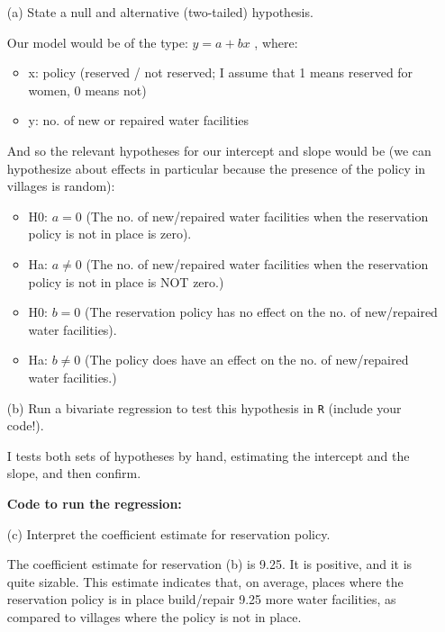 \documentclass[12pt,letterpaper]{article}
\begin{document}
\newpage
\begin{enumerate}
	\item [(a)] State a null and alternative (two-tailed) hypothesis. 
	\vspace{.5cm}
	
	Our model would be of the type:  
		$y = a + bx$ , where: 
		\begin{itemize}
		\item x: policy (reserved / not reserved; I assume that 1 means reserved for women, 0 means not)
		\item y:  no. of new or repaired water facilities 
	\end{itemize}
	And so the relevant hypotheses for our intercept and slope would be (we can hypothesize about effects in particular because the presence of the policy in villages is random): 
	\begin{itemize}
		\item H0: $a = 0$ (The no. of new/repaired water facilities when the reservation policy is not in place is zero). 
		\item Ha: $a \neq 0$ (The no. of new/repaired water facilities when the reservation policy is not in place is NOT zero.) 
		\item H0: $b = 0$ (The reservation policy has no effect on the no. of new/repaired water facilities). 
		\item Ha: $b \neq 0$ (The policy does have an effect on the no. of new/repaired water facilities.) 
	\end{itemize}
		
	\item [(b)] Run a bivariate regression to test this hypothesis in \texttt{R} (include your code!).
	\vspace{.5cm}
	
	I tests both sets of hypotheses by hand, estimating the intercept and the slope, and then confirm. 
	
	\noindent \textbf {Code to run the regression:}
	
	
	\newpage
	\item [(c)] Interpret the coefficient estimate for reservation policy. 
	\vspace{.5cm}
	
	The coefficient estimate for reservation (b) is 9.25. It is positive, and it is quite sizable. This estimate indicates that, on average, places where the reservation policy is in place build/repair 9.25 more water facilities, as compared to villages where the policy is not in place. 
	

\end{enumerate}
\end{document}
